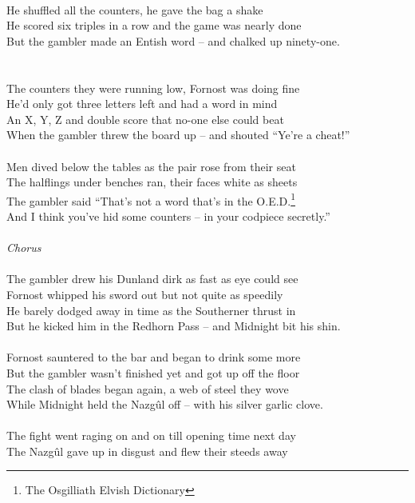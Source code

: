 \begin{multicols}{2}
\\
He shuffled all the counters, he gave the bag a shake
\\
He scored six triples in a row and the game was nearly done
\\
But the gambler made an Entish word – and chalked up ninety-one.
\\
\\
\\
The counters they were running low, Fornost was doing fine
\\
He’d only got three letters left and had a word in mind
\\
An X, Y, Z and double score that no-one else could beat
\\
When the gambler threw the board up – and shouted “Ye’re a cheat!”
\\
\\
Men dived below the tables as the pair rose from their seat
\\
The halflings under benches ran, their faces white as sheets
\\
The gambler said “That’s not a word that’s in the O.E.D.\footnote{The Osgilliath Elvish Dictionary}
\\
And I think you’ve hid some counters – in your codpiece secretly.”
\\
\\
\textit{Chorus}
\\
\\
The gambler drew his Dunland dirk as fast as eye could see
\\
Fornost whipped his sword out but not quite as speedily
\\
He barely dodged away in time as the Southerner thrust in
\\
But he kicked him in the Redhorn Pass – and Midnight bit his shin.
\\
\\
Fornost sauntered to the bar and began to drink some more
\\
But the gambler wasn’t finished yet and got up off the floor
\\
The clash of blades began again, a web of steel they wove
\\
While Midnight held the Nazg\^ul off – with his silver garlic clove.
\\
\\
The fight went raging on and on till opening time next day
\\
The Nazg\^ul gave up in disgust and flew their steeds away
\\

\end{multicols}
